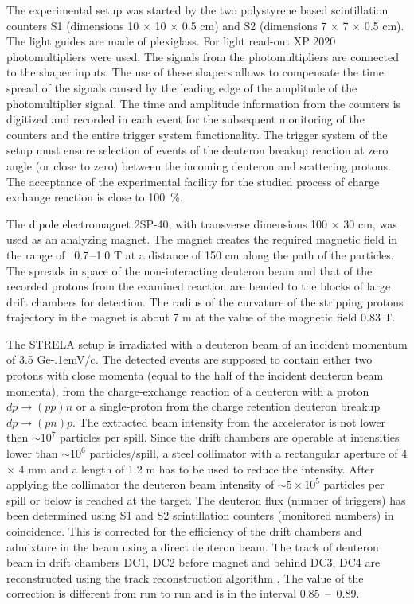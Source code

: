 \documentclass[twocolumn,epjc3]{svjour3}
\newcommand{\dpchex} {\ensuremath{dp \rightarrow (pp)n}\xspace}
\newcommand{\dpret}  {\ensuremath{dp \rightarrow (pn)p}\xspace}
\newcommand{\GeVc}   {Ge\kern-.1emV/c\xspace}
\begin{document}
The experimental setup was started by the two polystyrene based scintillation
counters S1 (dimensions 10 $\times$ 10 $\times$ 0.5 cm) and S2 (dimensions 7
$\times$ 7 $\times$ 0.5 cm). The light guides are made of plexiglass. For light
read-out XP 2020 photomultipliers were used. The signals from the
photomultipliers are connected to the shaper inputs. The use of these shapers
allows to compensate the time spread of the signals caused by the leading edge
of the amplitude of the photomultiplier signal. The time and amplitude
information from the counters is digitized and recorded in each event for the
subsequent monitoring of the counters and the entire trigger system
functionality. The trigger system of the setup must ensure selection of events
of the deuteron breakup reaction at zero angle (or close to zero) between the
incoming deuteron and scattering protons. The acceptance of the experimental
facility for the studied process of charge exchange reaction is close to 100~\%.

The dipole electromagnet 2SP-40, with transverse dimensions 100 $\times$ 30 cm,
was used as an analyzing magnet. The magnet creates the required magnetic field
in the range of \ 0.7\,--1.0 T at a distance of 150 cm along the path of the
particles. The spreads in space of the non-interacting deuteron beam and that of
the recorded protons from the examined reaction are bended to the blocks of
large drift chambers for detection. The radius of the curvature of the stripping
protons trajectory in the magnet is about 7 m at the value of the magnetic field
0.83 T.

The STRELA setup is irradiated with a deuteron beam of an incident momentum of
3.5 \GeVc. The detected events are supposed to contain either two protons with
close momenta (equal to the half of the incident deuteron beam momenta), from
the charge-exchange reaction of a deuteron with a proton \dpchex or a
single-proton from the charge retention deuteron breakup \dpret. The extracted
beam intensity from the accelerator is not lower then $\sim 10^{7}$ particles
per spill. Since the drift chambers are operable at intensities lower than
$\sim 10^{6}$ particles/spill, a steel collimator with a rectangular aperture of
4 $\times$ 4 mm and a length of 1.2 m has to be used to reduce the intensity.
After applying the collimator the deuteron beam intensity of $\sim 5\times10^5$
particles per spill or below is reached at the target. The deuteron flux (number
of triggers) has been determined using S1 and S2 scintillation counters
(monitored numbers) in coincidence. This is corrected for the efficiency of the
drift chambers and admixture in the beam using a direct deuteron beam. The track
of deuteron beam in drift chambers DC1, DC2 before magnet and behind DC3, DC4
are reconstructed using the track reconstruction algorithm \cite{gla13}. The
value of the correction is different from run to run and is in the interval
0.85~--~0.89.
\end{document}
